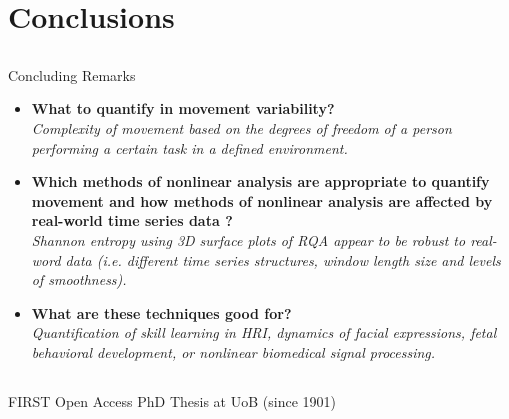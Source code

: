 \section{Conclusions}

\subsection{}
{
\begin{frame}{Concluding Remarks}

\begin{itemize}
	\item \textbf{ What to quantify in movement variability?} \\
	\textit{Complexity of movement based on the degrees of freedom of a person
	performing a certain task in a defined environment.}

	\item \textbf{ Which methods of nonlinear analysis are appropriate to quantify movement and
	how methods of nonlinear analysis are affected by real-world time series data ?} \\
	\textit{Shannon entropy using 3D surface plots of RQA 
	appear to be robust to real-word data (i.e. different time series
	structures, window length size and levels of smoothness).}

	\item \textbf{ What are these techniques good for?} \\
	\textit{Quantification of skill learning in HRI, 
	dynamics of facial expressions, 
	fetal behavioral development, or
	nonlinear biomedical signal processing.}
\end{itemize}

\end{frame}
}


\subsection{}
{

\begin{frame}{FIRST Open Access PhD Thesis at UoB (since 1901)}
    \begin{figure}
   \end{figure}
	
\end{frame}
}




